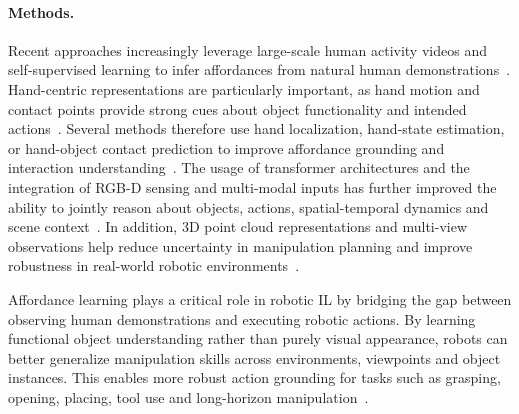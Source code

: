 \paragraph{Methods.}
Recent approaches increasingly leverage large-scale human activity videos and self-supervised learning to infer affordances from natural human demonstrations~\cite{Shan2020UnderstandingHH}. Hand-centric representations are particularly important, as hand motion and contact points provide strong cues about object functionality and intended actions~\cite{Luo2021LearningVA}. Several methods therefore use hand localization, hand-state estimation, or hand-object contact prediction to improve affordance grounding and interaction understanding~\cite{Tekin2019HOUE, Fang2018Demo2VecRO}.
The usage of transformer architectures and the integration of RGB-D sensing and multi-modal inputs has further improved the ability to jointly reason about objects, actions, spatial-temporal dynamics and scene context~\cite{Tekin2019HOUE}. In addition, 3D point cloud representations and multi-view observations help reduce uncertainty in manipulation planning and improve robustness in real-world robotic environments~\cite{Kim2014SemanticLO}.

Affordance learning plays a critical role in robotic \ac{IL} by bridging the gap between observing human demonstrations and executing robotic actions. By learning functional object understanding rather than purely visual appearance, robots can better generalize manipulation skills across environments, viewpoints and object instances. This enables more robust action grounding for tasks such as grasping, opening, placing, tool use and long-horizon manipulation~\cite{Eze2024LearningBW}.




